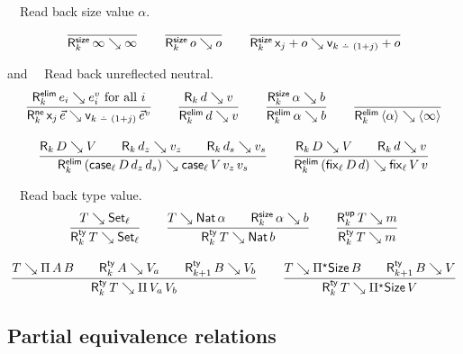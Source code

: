 \documentclass[acmlarge,review,anonymous]{acmart}\settopmatter{printfolios=true}
\begin{document}
\noindent
{}\ \ Read back size value $\alpha$.
\begin{gather*}
  \ru{
    }{\RSize k \infty \infty}
\qquad
  \ru{
    }{\RSize k o o}
\qquad
  \ru{
    }{\RSize k {\lev j + o} {\ind{k\dotminus(1+j)} + o}}
\end{gather*}

\noindent
{} and \ \ Read back unreflected neutral.
\begin{gather*}
  \ru{%
      \RElim k {e_i} {e^v_i} \mforall i
    }{\RNe k {\lev j\,\vec e} {\ind{k \monus (1+j)}\,\vec e^v}}
\qquad
  \ru{\R k d v
    }{\RElim k d v}
\qquad
  \ru{\RSize k \alpha b
    }{\RElim k \alpha b}
\qquad
  \ru{
    }{\RElim k {\ann \alpha} {\ann \infty}}
\\[2ex]
  \ru{\R k D V \qquad
      \R k {d_z} {v_z} \qquad
      \R k {d_s} {v_s}
    }{\RElim k {(\case[\ell] D {d_z} {d_s})} {\case[\ell] V {v_z} {v_s}}}
\qquad
  \ru{\R k D V \qquad
      \R k d v
    }{\RElim k {(\fix[\ell] D d)} {\fix[\ell] V v}}
\end{gather*}

\noindent
{} \ \ Read back type value.
\begin{gather*}
  \ru{T \evalsto \Set[\ell]
    }{\RTy k T {\Set[\ell]}}
\qquad
  \ru{T \evalsto \Nat \alpha \qquad
      \RSize k \alpha b
    }{\RTy k T {\Nat b}}
\qquad
  \ru{%
      \RUp k T m
    }{\RTy k T m}
\\[2ex]
  \ru{T \evalsto \piT A B \qquad
      \RTy k A {V_a} \qquad
      \RTy {k+1} B {V_b}
    }{\RTy k T {\piT {V_a} V_b}}
\qquad
  \ru{T \evalsto \epiT \Size B \qquad
      \RTy {k+1} B {V}
    }{\RTy k T {\epiT \Size V}}
\end{gather*}




\subsection{Partial equivalence relations}
\label{sec:per}
\end{document}
